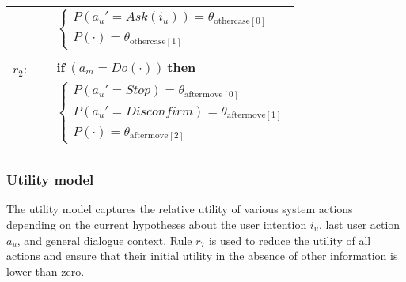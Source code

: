 \begin{footnotesize}
\begin{longtable}{p{2cm}l}
& \;\;\;\;\; $ \begin{cases}P(\mathit{a_u}'\!=\!\mathit{{Ask(i_u)}})\!=\!\theta_{\mathrm{othercase[0]}} \\
P(\cdot)\!=\!\theta_{\mathrm{othercase[1]}} \end{cases}$ \\ \\[-1mm]
$r_{2}$: \ \ & $ \textbf{if} \ (\mathit{a_m}\!=\!\mathit{Do(\cdot)}) \ \textbf{then} $ \\
 & \;\;\;\;\; $ \begin{cases}P(\mathit{a_u}'\!=\!\mathit{Stop})\!=\!\theta_{\mathrm{aftermove[0]}} \\
P(\mathit{a_u}'\!=\!\mathit{Disconfirm})\!=\!\theta_{\mathrm{aftermove[1]}} \\
P(\cdot)\!=\!\theta_{\mathrm{aftermove[2]}} \end{cases}$ \\ \\[-1mm]
\end{longtable}
\end{footnotesize}


\subsubsection*{Utility model}

The utility model captures the relative utility of various system actions depending on the current hypotheses about the user intention $i_u$, last user action $a_u$, and general dialogue context. Rule $r_7$ is used to reduce the utility of all actions and ensure that their initial utility in the absence of other information is lower than zero.

